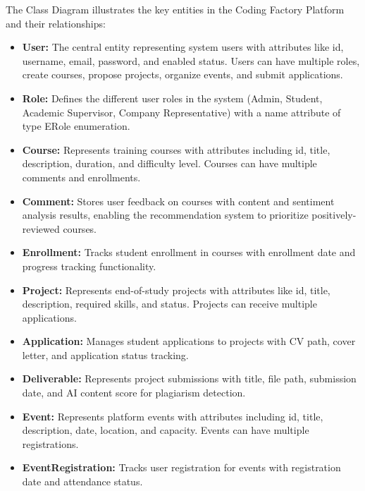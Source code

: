 \documentclass[12pt,a4paper]{report}
\begin{document}
The Class Diagram illustrates the key entities in the Coding Factory Platform and their relationships:

\begin{itemize}
    \item \textbf{User:} The central entity representing system users with attributes like id, username, email, password, and enabled status. Users can have multiple roles, create courses, propose projects, organize events, and submit applications.

    \item \textbf{Role:} Defines the different user roles in the system (Admin, Student, Academic Supervisor, Company Representative) with a name attribute of type ERole enumeration.

    \item \textbf{Course:} Represents training courses with attributes including id, title, description, duration, and difficulty level. Courses can have multiple comments and enrollments.

    \item \textbf{Comment:} Stores user feedback on courses with content and sentiment analysis results, enabling the recommendation system to prioritize positively-reviewed courses.

    \item \textbf{Enrollment:} Tracks student enrollment in courses with enrollment date and progress tracking functionality.

    \item \textbf{Project:} Represents end-of-study projects with attributes like id, title, description, required skills, and status. Projects can receive multiple applications.

    \item \textbf{Application:} Manages student applications to projects with CV path, cover letter, and application status tracking.

    \item \textbf{Deliverable:} Represents project submissions with title, file path, submission date, and AI content score for plagiarism detection.

    \item \textbf{Event:} Represents platform events with attributes including id, title, description, date, location, and capacity. Events can have multiple registrations.

    \item \textbf{EventRegistration:} Tracks user registration for events with registration date and attendance status.
\end{itemize}
\end{document}
